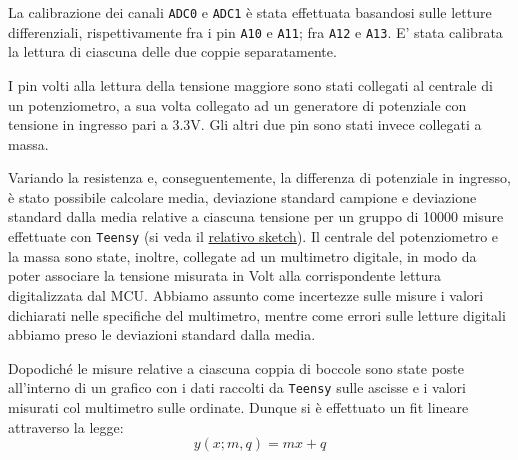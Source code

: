 \documentclass{article}[a4paper, oneside, 11pt]
\begin{document}
La calibrazione dei canali \verb+ADC0+ e \verb+ADC1+ \`e stata effettuata
basandosi sulle letture differenziali, rispettivamente fra i pin \verb+A10+
e \verb+A11+; fra \verb+A12+ e \verb+A13+. E’ stata calibrata la lettura
di ciascuna delle due coppie separatamente.

I pin volti alla lettura della tensione maggiore sono stati collegati al 
centrale di un potenziometro, a sua volta collegato ad un generatore di 
potenziale con tensione in ingresso pari a $3.3\si{\V}$. Gli altri due pin
sono stati invece collegati a massa.

Variando la resistenza e, conseguentemente, la differenza di potenziale in 
ingresso, \`e stato possibile calcolare media, deviazione standard campione
e deviazione standard dalla media relative a ciascuna tensione per 
un gruppo di 10000 misure effettuate con \verb+Teensy+ (si veda il 
\href{https://github.com/LucaCiucci/relaz_seme/blob/master/sketches/teensy_calib/teensy_calib.ino}{relativo sketch}).
Il centrale del potenziometro e la massa sono state, inoltre, collegate ad un
multimetro digitale, in modo da poter associare la tensione misurata in
Volt alla corrispondente lettura digitalizzata dal MCU. Abbiamo assunto come
incertezze sulle misure i valori dichiarati nelle specifiche del multimetro,
mentre come errori sulle letture digitali abbiamo preso le deviazioni standard
dalla media.

Dopodich\'e le misure relative a ciascuna coppia di boccole sono state poste 
all’interno di un grafico con i dati raccolti da \verb+Teensy+ sulle ascisse
e i valori misurati col multimetro sulle ordinate. Dunque si \`e effettuato un
fit lineare attraverso la legge:
\begin{equation}
y(x; m, q)  = m x + q
\end{equation}
\end{document}
